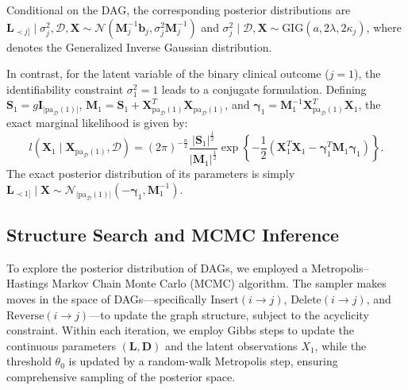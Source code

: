 \documentclass[twoside]{article}
\begin{document}
Conditional on the DAG, the corresponding posterior distributions are $\boldsymbol{L}_{\prec j\rbrack} \mid \sigma_j^2, \mathcal{D}, \boldsymbol{X} \sim \mathcal{N} (\boldsymbol{M}_j^{-1}\boldsymbol{b}_j, \sigma_j^2 \boldsymbol{M}_j^{-1})$ and 
$\sigma_j^2 \mid \mathcal{D}, \boldsymbol{X} \sim \text{GIG}\left(a, 2\lambda, 2\kappa_j\right)$, where  denotes the Generalized Inverse Gaussian distribution.

In contrast, for the latent variable of the binary clinical outcome ($j = 1$), the identifiability constraint $\sigma_1^2 = 1$ leads to a conjugate formulation. Defining $\boldsymbol{S}_1 = g\boldsymbol{I}_{\lvert\text{pa}_{\mathcal{D}}(1)\rvert}$, $\boldsymbol{M}_1 = \boldsymbol{S}_1 + \boldsymbol{X}_{\text{pa}_{\mathcal{D}}(1)}^{T}\boldsymbol{X}_{\text{pa}_{\mathcal{D}}(1)}$, and $\boldsymbol{\gamma}_1 = \boldsymbol{M}_1^{-1}\boldsymbol{X}_{\text{pa}_{\mathcal{D}}(1)}^{T}\boldsymbol{X}_1$, the exact marginal likelihood is given by:
\begin{equation*}
	l(\boldsymbol{X}_1 \mid \boldsymbol{X}_{\text{pa}_{\mathcal{D}}(1)}, \mathcal{D}) = (2\pi)^{-\frac{n}{2}} \frac{\lvert\boldsymbol{S}_1\rvert^{\frac{1}{2}}}{\lvert\boldsymbol{M}_1\rvert^{\frac{1}{2}}} \exp\left\{-\frac{1}{2}\left(\boldsymbol{X}_1^{T}\boldsymbol{X}_1 - \boldsymbol{\gamma}_1^{T}\boldsymbol{M}_1\boldsymbol{\gamma}_1\right)\right\}.
\end{equation*}
The exact posterior distribution of its parameters is simply $\boldsymbol{L}_{\prec 1\rbrack} \mid \boldsymbol{X} \sim \mathcal{N}_{\lvert\text{pa}_{\mathcal{D}}(1)\rvert} (-\boldsymbol{\gamma}_1, \boldsymbol{M}_1^{-1})$.

\vspace{-0.3cm}\subsection{Structure Search and MCMC Inference}
To explore the posterior distribution of DAGs, we employed a Metropolis–Hastings Markov Chain Monte Carlo (MCMC) algorithm. The sampler makes moves in the space of DAGs—specifically $\text{Insert}(i \to j)$, $\text{Delete}(i \to j)$, and $\text{Reverse}(i \to j)$—to update the graph structure, subject to the acyclicity constraint. Within each iteration, we employ Gibbs steps to update the continuous parameters $\left(\boldsymbol{L},\boldsymbol{D}\right)$ and the latent observations $X_1$, while the threshold $\theta_0$ is updated by a random-walk Metropolis step, ensuring comprehensive sampling of the posterior space.
\end{document}
